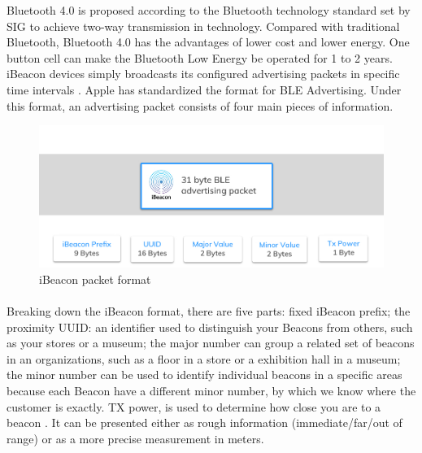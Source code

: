 \documentclass[12pt]{article}
\begin{document}
Bluetooth 4.0 is proposed according to the Bluetooth technology standard set by SIG to achieve two-way transmission in technology. Compared with traditional Bluetooth, Bluetooth 4.0 has the advantages of lower cost and lower energy. One button cell can make the Bluetooth Low Energy be operated for 1 to 2 years. \cite{taiwan} \\

iBeacon devices simply broadcasts its configured advertising packets in specific time intervals \cite{one}. Apple has standardized the format for BLE Advertising. Under this format, an advertising packet consists of four main pieces of information. \\


\begin{figure}[H]
	\centering
	\includegraphics[width=1.0\linewidth]{media/ibeacon-format.jpg}
	\caption{iBeacon packet format}
	\label{fig:translate_uml}
\end{figure} 

\paragraph{}Breaking down the iBeacon format, there are five parts: fixed iBeacon prefix; the proximity UUID: an identifier used to distinguish your Beacons from others, such as your stores or a museum; the major number can group a related set of beacons in an organizations, such as a floor in a store or a exhibition hall in a museum; the minor number can be used to identify individual beacons in a specific areas because each Beacon have a different minor number, by which we know where the customer is exactly. TX power, is used to determine how close you are to a beacon \cite{beacons}. It can be presented either as  rough information (immediate/far/out of range) or as a more precise measurement in meters.
%
\end{document}
